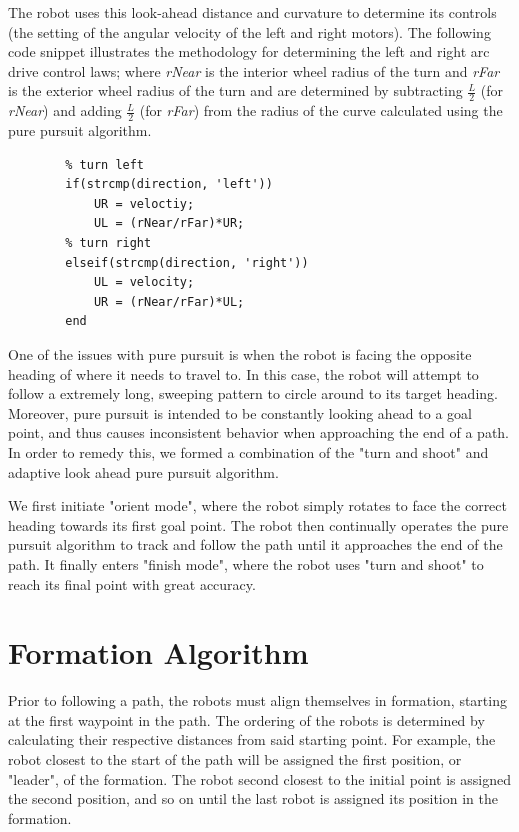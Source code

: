 \documentclass[journal]{IEEEtran}
\begin{document}
    The robot uses this look-ahead distance and curvature to determine its controls (the setting of the angular velocity of the left and right motors). The following code snippet illustrates the methodology for determining the left and right arc drive control laws; where \textit{rNear} is the interior wheel radius of the turn and \textit{rFar} is the exterior wheel radius of the turn and are determined by subtracting $\frac{L}{2}$ (for \textit{rNear}) and adding $\frac{L}{2}$ (for \textit{rFar}) from the radius of the curve calculated using the pure pursuit algorithm.
        
    \begin{lstlisting}
        % turn left
        if(strcmp(direction, 'left'))
            UR = veloctiy;
            UL = (rNear/rFar)*UR;
        % turn right
        elseif(strcmp(direction, 'right'))
            UL = velocity;
            UR = (rNear/rFar)*UL;
        end
    \end{lstlisting}
        
    One of the issues with pure pursuit is when the robot is facing the opposite heading of where it needs to travel to. In this case, the robot will attempt to follow a extremely long, sweeping pattern to circle around to its target heading. Moreover, pure pursuit is intended to be constantly looking ahead to a goal point, and thus causes inconsistent behavior when approaching the end of a path. In order to remedy this, we formed a combination of the "turn and shoot" and adaptive look ahead pure pursuit algorithm.  
    
    We first initiate "orient mode", where the robot simply rotates to face the correct heading towards its first goal point. The robot then continually operates the pure pursuit algorithm to track and follow the path until it approaches the end of the path. It finally enters "finish mode", where the robot uses "turn and shoot" to reach its final point with great accuracy. 

\section{Formation Algorithm}
    Prior to following a path, the robots must align themselves in formation, starting at the first waypoint in the path. The ordering of the robots is determined by calculating their respective distances from said starting point. For example, the robot closest to the start of the path will be assigned the first position, or "leader", of the formation. The robot second closest to the initial point is assigned the second position, and so on until the last robot is assigned its position in the formation.\\
    
\end{document}
